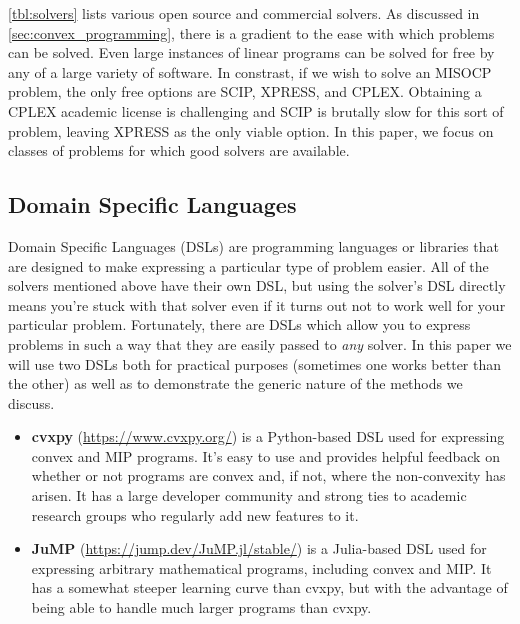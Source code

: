 \documentclass{article}
\begin{document}


\autoref{tbl:solvers} lists various open source and commercial solvers. As discussed in \autoref{sec:convex_programming}, there is a gradient to the ease with which problems can be solved. Even large instances of linear programs can be solved for free by any of a large variety of software. In constrast, if we wish to solve an MISOCP problem, the only free options are SCIP, XPRESS, and CPLEX. Obtaining a CPLEX academic license is challenging and SCIP is brutally slow for this sort of problem, leaving XPRESS as the only viable option. In this paper, we focus on classes of problems for which good solvers are available.

\subsection{Domain Specific Languages}

Domain Specific Languages (DSLs) are programming languages or libraries that are designed to make expressing a particular type of problem easier. All of the solvers mentioned above have their own DSL, but using the solver's DSL directly means you're stuck with that solver even if it turns out not to work well for your particular problem. Fortunately, there are DSLs which allow you to express problems in such a way that they are easily passed to \textit{any} solver. In this paper we will use two DSLs both for practical purposes (sometimes one works better than the other) as well as to demonstrate the generic nature of the methods we discuss.
\begin{itemize}
\item \textbf{cvxpy} (\url{https://www.cvxpy.org/}) is a Python-based DSL used for expressing convex and MIP programs. It's easy to use and provides helpful feedback on whether or not programs are convex and, if not, where the non-convexity has arisen. It has a large developer community and strong ties to academic research groups who regularly add new features to it.
\item \textbf{JuMP} (\url{https://jump.dev/JuMP.jl/stable/}) is a Julia-based DSL used for expressing arbitrary mathematical programs, including convex and MIP. It has a somewhat steeper learning curve than cvxpy, but with the advantage of being able to handle much larger programs than cvxpy.
\end{itemize}

\end{document}
